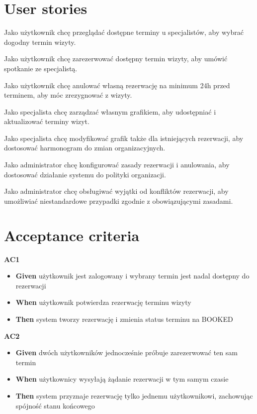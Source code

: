 \documentclass[12pt,a4paper]{article}
\begin{document}
\section{User stories}

\begin{description}[leftmargin=1.8cm, labelwidth=1.3cm, labelsep=0.5cm, style=nextline]
  \item[US1] Jako użytkownik chcę przeglądać dostępne terminy u specjalistów, aby wybrać dogodny termin wizyty.
  \item[US2] Jako użytkownik chcę zarezerwować dostępny termin wizyty, aby umówić spotkanie ze specjalistą.
  \item[US3] Jako użytkownik chcę anulować własną rezerwację na minimum 24h przed terminem, aby móc zrezygnować z wizyty.
  \item[US4] Jako specjalista chcę zarządzać własnym grafikiem, aby udostępniać i aktualizować terminy wizyt.
  \item[US5] Jako specjalista chcę modyfikować grafik także dla istniejących rezerwacji, aby dostosować harmonogram do zmian organizacyjnych.
  \item[US6] Jako administrator chcę konfigurować zasady rezerwacji i anulowania, aby dostosować działanie systemu do polityki organizacji.
  \item[US7] Jako administrator chcę obsługiwać wyjątki od konfliktów rezerwacji, aby umożliwiać niestandardowe przypadki zgodnie z obowiązującymi zasadami.
\end{description}

\section{Acceptance criteria}

\textbf{AC1}
\begin{itemize}[itemsep=2pt]
  \item \textbf{Given} użytkownik jest zalogowany i wybrany termin jest nadal dostępny do rezerwacji
  \item \textbf{When} użytkownik potwierdza rezerwację terminu wizyty
  \item \textbf{Then} system tworzy rezerwację i zmienia status terminu na BOOKED
\end{itemize}

\vspace{0.4em}
\textbf{AC2}
\begin{itemize}[itemsep=2pt]
  \item \textbf{Given} dwóch użytkowników jednocześnie próbuje zarezerwować ten sam termin
  \item \textbf{When} użytkownicy wysyłają żądanie rezerwacji w tym samym czasie
  \item \textbf{Then} system przyznaje rezerwację tylko jednemu użytkownikowi, zachowując spójność stanu końcowego
\end{itemize}
\end{document}
